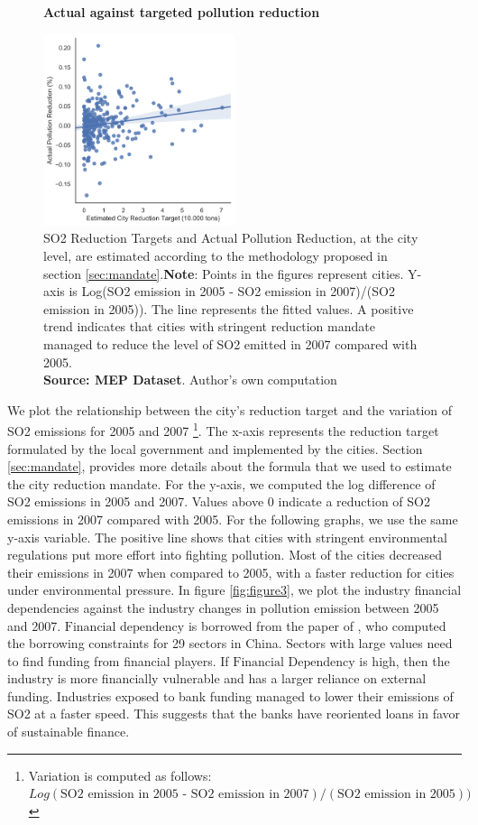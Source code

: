 \documentclass[12pt]{article}
\begin{document}
\begin{figure}[ht]
    \centering
    \textbf{Actual against targeted pollution reduction}\par\medskip
    \includegraphics[width=0.5\textwidth]{fig_2}
    \caption{SO2 Reduction Targets and Actual Pollution Reduction, at the city level, are estimated according to the methodology proposed in section \ref{sec:mandate}.\textbf{Note}: Points in the figures represent cities. Y-axis is Log(SO2 emission in 2005 - SO2 emission in 2007)/(SO2 emission in 2005)). The line represents the fitted values. A positive trend indicates that cities with stringent reduction mandate managed to reduce the level of SO2 emitted in 2007 compared with 2005. \\
    \textbf{Source: MEP Dataset}. Author's own computation}
    \label{fig:figure2}
\end{figure}

We plot the relationship between the city’s reduction target and the variation of SO2 emissions for 2005 and 2007 \footnote{Variation is computed as follows: $Log(\text{SO2 emission in 2005 - SO2 emission in 2007})/(\text{SO2 emission in 2005}))$}. The x-axis represents the reduction target formulated by the local government and implemented by the cities. Section \ref{sec:mandate}, provides more details about the formula that we used to estimate the city reduction mandate. For the y-axis, we computed the log difference of SO2 emissions in 2005 and 2007. Values above 0 indicate a reduction of SO2 emissions in 2007 compared with 2005. For the following graphs, we use the same y-axis variable. The positive line shows that cities with stringent environmental regulations put more effort into fighting pollution. Most of the cities decreased their emissions in 2007 when compared to 2005, with a faster reduction for cities under environmental pressure. In figure \ref{fig:figure3}, we plot the industry financial dependencies against the industry changes in pollution emission between 2005 and 2007. $\text{Financial dependency}$ is borrowed from the paper of \cite{Fan2015-bm}, who computed the borrowing constraints for 29 sectors in China. Sectors with large values need to find funding from financial players. If $\text{Financial Dependency}$ is high, then the industry is more financially vulnerable and has a larger reliance on external funding. Industries exposed to bank funding managed to lower their emissions of SO2 at a faster speed. This suggests that the banks have reoriented loans in favor of sustainable finance. 
\end{document}
